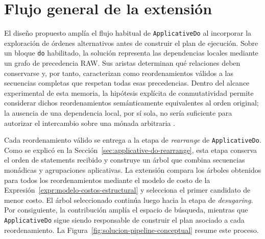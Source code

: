 
\section{Flujo general de la extensión}
\label{sec:solucion-flujo}

El diseño propuesto amplía el flujo habitual de \texttt{ApplicativeDo} al incorporar la exploración de órdenes alternativos antes de construir el plan de ejecución. Sobre un bloque \texttt{do} habilitado, la solución representa las dependencias locales mediante un grafo de precedencia RAW. Sus aristas determinan qué relaciones deben conservarse y, por tanto, caracterizan como reordenamientos válidos a las secuencias completas que respetan todas esas precedencias. Dentro del alcance experimental de esta memoria, la hipótesis explícita de conmutatividad permite considerar dichos reordenamientos semánticamente equivalentes al orden original; la ausencia de una dependencia local, por sí sola, no sería suficiente para autorizar el intercambio sobre una mónada arbitraria \cite[p.~94]{MarlowPJKM2016}.

Cada reordenamiento válido se entrega a la etapa de \textit{rearrange} de \texttt{ApplicativeDo}. Como se explicó en la Sección~\ref{sec:applicative-do-rearrange}, esta etapa conserva el orden de statements recibido y construye un árbol que combina secuencias monádicas y agrupaciones aplicativas. La extensión compara los árboles obtenidos para todos los reordenamientos mediante el modelo de costo de la Expresión~\ref{expr:modelo-costos-estructural} y selecciona el primer candidato de menor costo. El árbol seleccionado continúa luego hacia la etapa de \textit{desugaring}. Por consiguiente, la contribución amplía el espacio de búsqueda, mientras que \texttt{ApplicativeDo} sigue siendo responsable de construir el plan asociado a cada reordenamiento. La Figura~\ref{fig:solucion-pipeline-conceptual} resume este proceso.


